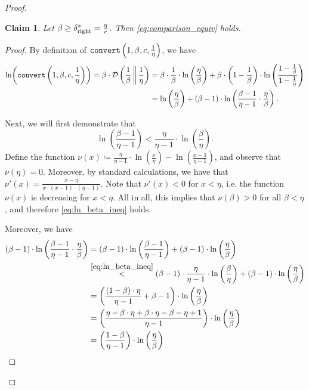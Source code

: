 \documentclass[letterpaper,11pt]{article}
\newenvironment{claimproof}{\begin{proof}\renewcommand{\qedsymbol}{$\lrcorner$}}{\end{proof}}
\newcommand{\1}[1]{\mathds{1}\left[#1\right]}
\newcommand{\runtime}[1][\alpha, \beta, c, q]{\textnormal{\texttt{convert}}\left(#1\right)}
\newcommand{\D}[2]{\mathcal{D}\left(#1\, \middle\|\,#2 \right)}
\newtheorem{claim}[theorem]{Claim}
\newcommand{\sdeltar}{\delta^{*}_{\textnormal{right}}}
\begin{document}
\begin{proof}
	\begin{claim}\label{claim:beta_greater_sdelta}
		Let $\beta \geq \sdeltar = \frac{\eta}{c}$. Then \eqref{eq:comparison_equiv} holds.
	\end{claim}
	
	\begin{claimproof}
		By definition of $\runtime[1,\beta,c,\frac{1}{\eta}]$, we have
		\begin{align}
			\ln\biggl(\runtime[1,\beta,c,\frac{1}{\eta}]\biggr) = \beta \cdot \D{\frac{1}{\beta}}{\frac{1}{\eta}} &= \beta \cdot \frac{1}{\beta} \cdot \ln\left( \frac{\eta}{\beta} \right)  + \beta \cdot  \left( 1 - \frac{1}{\beta} \right) \cdot \ln\left(\frac{ 1 - \frac{1}{\beta} }{1 - \frac{1}{\eta}}\right)\notag\\
																      &= \ln\left( \frac{\eta}{\beta} \right) + (\beta - 1) \cdot \ln\left( \frac{\beta - 1}{\eta - 1} \cdot \frac{\eta}{\beta} \right).\label{eq:convert_beta_greater_delta}
		\end{align}

		Next, we will first demonstrate that
		\begin{equation}\label{eq:ln_beta_ineq}
			\ln\left( \frac{\beta-1}{\eta- 1} \right) < \frac{\eta}{\eta - 1}\cdot\ln\left( \frac{\beta}{\eta} \right).
		\end{equation}
		Define the function $\nu(x) \coloneqq \frac{\eta}{\eta - 1} \cdot \ln\left( \frac{x}{\eta} \right) - \ln\left( \frac{x-1}{\eta - 1} \right) $, and observe that $\nu(\eta) = 0$.
		Moreover, by standard calculations, we have that $\nu'(x) = \frac{x - \eta}{x\cdot (x - 1) \cdot (\eta - 1)}$.
		Note that $\nu'(x) < 0$ for $x < \eta$, i.e. the function $\nu(x)$ is decreasing for $x < \eta$.
		All in all, this implies that $\nu(\beta) > 0$ for all $\beta < \eta$, and therefore \eqref{eq:ln_beta_ineq} holds.		

		Moreover, we have
		\begin{align}
			(\beta - 1) \cdot \ln\left( \frac{\beta - 1}{\eta - 1} \cdot \frac{\eta}{\beta} \right) &= (\beta - 1) \cdot \ln\left( \frac{\beta - 1}{\eta - 1} \right) + (\beta - 1) \cdot \ln\left( \frac{\eta}{\beta} \right) \notag\\
														&\stackrel{\eqref{eq:ln_beta_ineq}}{<} (\beta - 1) \cdot \frac{\eta}{\eta - 1} \cdot \ln\left( \frac{\beta}{\eta} \right) + (\beta - 1) \cdot \ln\left( \frac{\eta}{\beta} \right)\notag\\
														&= \biggl( \frac{(1-\beta)\cdot \eta}{\eta - 1} + \beta - 1 \biggr)\cdot \ln\left( \frac{\eta}{\beta} \right)\notag\\
														&= \biggl(\frac{\eta - \beta \cdot \eta + \beta \cdot \eta - \beta - \eta + 1}{\eta - 1}\biggr) \cdot \ln\left( \frac{\eta}{\beta} \right) \notag\\
														&= \left( \frac{1 - \beta}{\eta - 1} \right) \cdot \ln\left( \frac{\eta}{\beta} \right)\label{eq:another_ineq_fidelity} 
		\end{align}



\end{claimproof}
\end{proof}
\end{document}
